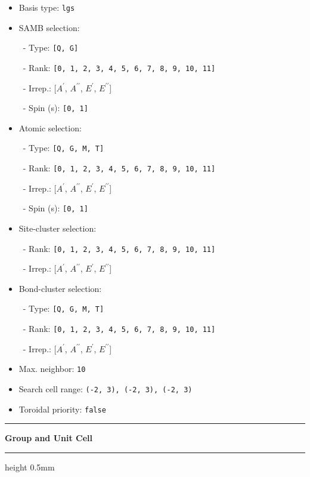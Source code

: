\documentclass[fleqn,10pt,landscape]{jsarticle}
\begin{document}
\begin{itemize}
\item Basis type: \texttt{lgs}

\item SAMB selection:

\, - Type: \texttt{[Q, G]}

\, - Rank: \texttt{[0, 1, 2, 3, 4, 5, 6, 7, 8, 9, 10, 11]}

\, - Irrep.: [$A^{\prime}$, $A^{\prime\prime}$, $E^{\prime}$, $E^{\prime\prime}$]

\, - Spin (s): \texttt{[0, 1]}

\item Atomic selection:

\, - Type: \texttt{[Q, G, M, T]}

\, - Rank: \texttt{[0, 1, 2, 3, 4, 5, 6, 7, 8, 9, 10, 11]}

\, - Irrep.: [$A^{\prime}$, $A^{\prime\prime}$, $E^{\prime}$, $E^{\prime\prime}$]

\, - Spin (s): \texttt{[0, 1]}

\item Site-cluster selection:

\, - Rank: \texttt{[0, 1, 2, 3, 4, 5, 6, 7, 8, 9, 10, 11]}

\, - Irrep.: [$A^{\prime}$, $A^{\prime\prime}$, $E^{\prime}$, $E^{\prime\prime}$]

\item Bond-cluster selection:

\, - Type: \texttt{[Q, G, M, T]}

\, - Rank: \texttt{[0, 1, 2, 3, 4, 5, 6, 7, 8, 9, 10, 11]}

\, - Irrep.: [$A^{\prime}$, $A^{\prime\prime}$, $E^{\prime}$, $E^{\prime\prime}$]

\item Max. neighbor: \texttt{10}

\item Search cell range: \texttt{(-2, 3), (-2, 3), (-2, 3)}

\item Toroidal priority: \texttt{false}

\end{itemize}
\vspace{5mm}
\noindent \rule[0.5mm]{5mm}{0.5mm}\hspace{3mm}\textbf{Group and Unit Cell}\hspace{3mm}\leaders\hrule height 0.5mm\hfill\kern0pt
\vspace{3mm}
\end{document}
